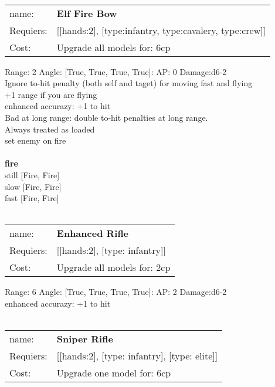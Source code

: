 \ \\
\begin{tabular}{ll}
name: & {\bf Elf Fire Bow } \\
Requiers: & [[hands:2], [type:infantry, type:cavalery, type:crew]] \\
Cost: & Upgrade all models for: 6cp \\
\end{tabular}



Range: 2  Angle: [True, True, True, True]: AP: 0 Damage:d6-2 \\
Ignore to-hit penalty (both self and taget) for moving fast and flying\\ 
+1 range if you are flying\\ 
enhanced accurazy: +1 to hit\\ 
Bad at long range: double to-hit penalties at long range.\\ 
Always treated as loaded\\ 
set enemy on fire\\ 







\ \\ {\bf fire } \\
still [Fire, Fire] \\
slow [Fire, Fire] \\
fast [Fire, Fire] \\

\ \\
\begin{tabular}{ll}
name: & {\bf Enhanced Rifle } \\
Requiers: & [[hands:2], [type: infantry]] \\
Cost: & Upgrade all models for: 2cp \\
\end{tabular}



Range: 6  Angle: [True, True, True, True]: AP: 2 Damage:d6-2 \\
enhanced accurazy: +1 to hit\\ 








\ \\
\begin{tabular}{ll}
name: & {\bf Sniper Rifle } \\
Requiers: & [[hands:2], [type: infantry], [type: elite]] \\
Cost: & Upgrade one model for: 6cp \\
\end{tabular}



